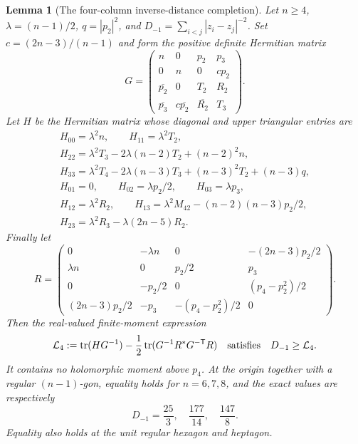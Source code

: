\documentclass[11pt]{article}
\newtheorem{lemma}[theorem]{Lemma}
\theoremstyle{remark}
\numberwithin{equation}{section}
\begin{document}
\begin{lemma}[The four-column inverse-distance completion]
\label{lem:noorigin-oct8-skew-four}
Let $n\ge4$, $\lambda=(n-1)/2$, $q=|p_2|^2$, and
$D_{-1}=\sum_{i<j}|z_i-z_j|^{-2}$.
Set $c=(2n-3)/(n-1)$ and form the positive definite Hermitian matrix
\[
 G=\begin{pmatrix}
 n&0&p_2&p_3\\
 0&n&0&cp_2\\
 \overline{p_2}&0&T_2&R_2\\
 \overline{p_3}&c\overline{p_2}&\overline{R_2}&T_3
 \end{pmatrix}.
\]
Let $H$ be the Hermitian matrix whose diagonal and upper triangular
entries are
\begin{gather*}
 H_{00}=\lambda^2n,\qquad H_{11}=\lambda^2T_2,\\
 H_{22}=\lambda^2T_3-2\lambda(n-2)T_2+(n-2)^2n,\\
 H_{33}=\lambda^2T_4-2\lambda(n-3)T_3+(n-3)^2T_2+(n-3)q,\\
 H_{01}=0,\qquad H_{02}=\lambda p_2/2,\qquad H_{03}=\lambda p_3,\\
 H_{12}=\lambda^2R_2,\qquad
 H_{13}=\lambda^2M_{42}-(n-2)(n-3)p_2/2,\\
 H_{23}=\lambda^2R_3-\lambda(2n-5)R_2.
\end{gather*}
Finally let
\[
 R=\begin{pmatrix}
 0&-\lambda n&0&-(2n-3)p_2/2\\
 \lambda n&0&p_2/2&p_3\\
 0&-p_2/2&0&(p_4-p_2^2)/2\\
 (2n-3)p_2/2&-p_3&-(p_4-p_2^2)/2&0
 \end{pmatrix}.
\]
Then the real-valued finite-moment expression
\begin{equation}\label{eq:noorigin-oct8-skew-four}
 \mathcal L_4:=\operatorname{tr}(HG^{-1})
 -\frac12\operatorname{tr}(G^{-1}R^*G^{-\mathsf T}R)
 \quad\hbox{satisfies}\quad D_{-1}\ge\mathcal L_4.
\end{equation}
It contains no holomorphic moment above $p_4$.
At the origin together with a regular $(n-1)$-gon, equality holds
for $n=6,7,8$, and the exact values are respectively
\[
                  D_{-1}=\frac{25}{3},\quad
                  \frac{177}{14},\quad\frac{147}{8}.
\]
Equality also holds at the unit regular hexagon and heptagon.
\end{lemma}
\end{document}

